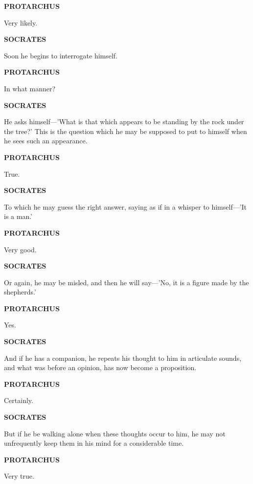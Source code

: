 \documentclass[11pt,letter]{article}
\begin{document}
\par \textbf{PROTARCHUS}
\par   Very likely.

\par \textbf{SOCRATES}
\par   Soon he begins to interrogate himself.

\par \textbf{PROTARCHUS}
\par   In what manner?

\par \textbf{SOCRATES}
\par   He asks himself—'What is that which appears to be standing by the rock under the tree?' This is the question which he may be supposed to put to himself when he sees such an appearance.

\par \textbf{PROTARCHUS}
\par   True.

\par \textbf{SOCRATES}
\par   To which he may guess the right answer, saying as if in a whisper to himself—'It is a man.'

\par \textbf{PROTARCHUS}
\par   Very good.

\par \textbf{SOCRATES}
\par   Or again, he may be misled, and then he will say—'No, it is a figure made by the shepherds.'

\par \textbf{PROTARCHUS}
\par   Yes.

\par \textbf{SOCRATES}
\par   And if he has a companion, he repeats his thought to him in articulate sounds, and what was before an opinion, has now become a proposition.

\par \textbf{PROTARCHUS}
\par   Certainly.

\par \textbf{SOCRATES}
\par   But if he be walking alone when these thoughts occur to him, he may not unfrequently keep them in his mind for a considerable time.

\par \textbf{PROTARCHUS}
\par   Very true.
\end{document}

